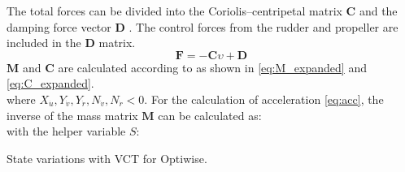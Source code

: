 The total forces can be divided into the Coriolis–centripetal matrix $\mathbf{C}$ and the damping force vector $\mathbf{D}$ \cite{fossenHandbookMarineCraft2011}. The control forces from the rudder and propeller are included in the $\mathbf{D}$ matrix.
\begin{equation}
    \label{eq:upsilon1d}
\mathbf{F} = - \mathbf{C} \upsilon + \mathbf{D}
\end{equation}
$\mathbf{M}$ and $\mathbf{C}$ are calculated according to \textcite{fossenHandbookMarineCraft2011} as shown in \autoref{eq:M_expanded} and \autoref{eq:C_expanded}. 
\begin{equation}
    \label{eq:M_expanded}
    
\end{equation}
\begin{equation}
    \label{eq:C_expanded}
    
\end{equation}
where $X_{\dot{u}},Y_{\dot{v}},Y_{\dot{r}},N_{\dot{v}},N_{\dot{r}} < 0$. 
For the calculation of acceleration \autoref{eq:acc}, the inverse of the mass matrix $\mathbf{M}$ can be calculated as:
\begin{equation}
    \label{eq:M_inv}
    
\end{equation}
with the helper variable $S$:
\begin{equation}
    \label{eq:S}
    
\end{equation}

\begin{table}[h]
    \centering
    \small
    \caption{State variations with VCT for Optiwise.}
    \label{tab:VCT_optiwise}
\end{table}


